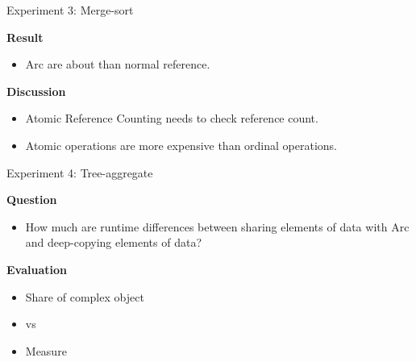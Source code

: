 \documentclass[9pt]{beamer}
\begin{document}

\begin{frame}[fragile]{Experiment 3: Merge-sort}

    \textbf{Result}
    \begin{itemize}
        \item Arc are about  than normal reference.
    \end{itemize}

    \vspace{0.5cm}

    \textbf{Discussion}
    \begin{itemize}
        \item Atomic Reference Counting needs to check reference count.
        \item Atomic operations are more expensive than ordinal operations.
    \end{itemize}

\end{frame}


\begin{frame}[fragile]{Experiment 4: Tree-aggregate}

    \textbf{Question}
    \begin{itemize}
        \item How much are runtime differences between sharing elements of data with Arc and deep-copying elements of data?
    \end{itemize}

    \vspace{0.5cm}

    \textbf{Evaluation}
    \begin{itemize}
        \item Share  of complex object
        \item {} vs 
        \item Measure 
    \end{itemize}

\end{frame}

\end{document}

